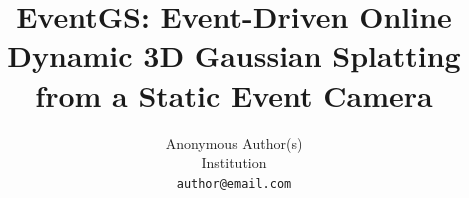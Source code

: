 \documentclass[10pt,twocolumn,letterpaper]{article}
\title{EventGS: Event-Driven Online Dynamic 3D Gaussian Splatting\\
from a Static Event Camera}
\author{Anonymous Author(s)\\
Institution\\
{\tt\small author@email.com}
}
\begin{document}
\maketitle







{
    \small
    
    
}
\end{document}
